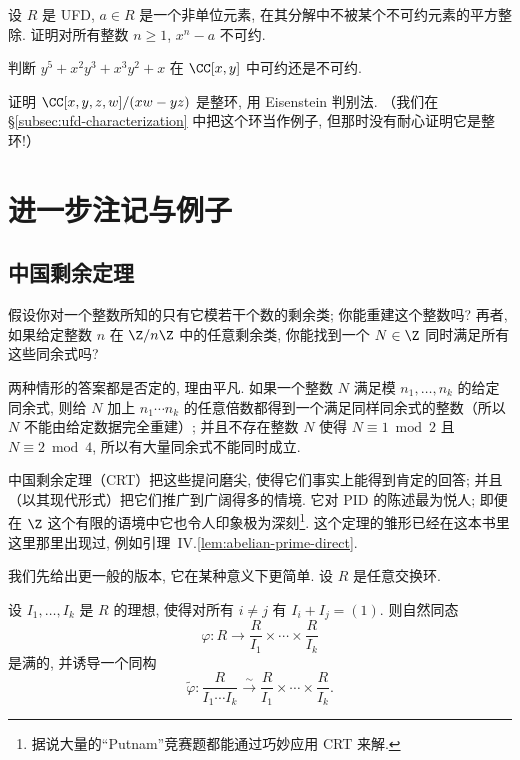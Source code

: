 \begin{prob}
\label{ex:xn-minus-a-irred-ufd}
设 $R$ 是 UFD, $a\in R$ 是一个非单位元素, 在其分解中不被某个不可约元素的平方整除. 证明对所有整数 $n\geq 1$, $x^n-a$ 不可约.
\end{prob}

\begin{prob}
\label{ex:cxy-reducible}
判断 $y^5+x^2y^3+x^3y^2+x$ 在 $\CC[x,y]$ 中可约还是不可约.
\end{prob}

\begin{prob}
\label{ex:cxyzw-domain-eisenstein}
证明 $\CC[x,y,z,w]/(xw-yz)$ 是整环, 用 Eisenstein 判别法. （我们在 \S\ref{subsec:ufd-characterization} 中把这个环当作例子, 但那时没有耐心证明它是整环!）
\end{prob}

\section{进一步注记与例子}
\label{sec:further-remarks}

\subsection{中国剩余定理}
\label{subsec:crt}

假设你对一个整数所知的只有它模若干个数的剩余类; 你能重建这个整数吗? 再者, 如果给定整数 $n$ 在 $\Z/n\Z$ 中的任意剩余类, 你能找到一个 $N\in\Z$ 同时满足所有这些同余式吗?

两种情形的答案都是否定的, 理由平凡. 如果一个整数 $N$ 满足模 $n_1,\ldots,n_k$ 的给定同余式, 则给 $N$ 加上 $n_1\cdots n_k$ 的任意倍数都得到一个满足同样同余式的整数（所以 $N$ 不能由给定数据完全重建）; 并且不存在整数 $N$ 使得 $N\equiv 1\bmod 2$ 且 $N\equiv 2\bmod 4$, 所以有大量同余式不能同时成立.

中国剩余定理（CRT）把这些提问磨尖, 使得它们事实上能得到肯定的回答; 并且（以其现代形式）把它们推广到广阔得多的情境. 它对 PID 的陈述最为悦人; 即便在 $\Z$ 这个有限的语境中它也令人印象极为深刻\footnote{据说大量的``Putnam''竞赛题都能通过巧妙应用 CRT 来解.}. 这个定理的雏形已经在这本书里这里那里出现过, 例如引理~IV.\ref{lem:abelian-prime-direct}.

我们先给出更一般的版本, 它在某种意义下更简单. 设 $R$ 是任意交换环.

\begin{theorem}\label{thm:crt-general}
设 $I_1,\ldots,I_k$ 是 $R$ 的理想, 使得对所有 $i\neq j$ 有 $I_i+I_j=(1)$. 则自然同态
\[
\varphi:R\longrightarrow \frac{R}{I_1}\times\cdots\times\frac{R}{I_k}
\]
是满的, 并诱导一个同构
\[
\tilde{\varphi}:\frac{R}{I_1\cdots I_k}\xrightarrow{\sim}\frac{R}{I_1}\times\cdots\times\frac{R}{I_k}.
\]
\end{theorem}

